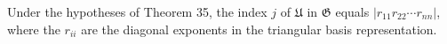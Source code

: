 Under the hypotheses of Theorem 35, the index $j$ of $\mathfrak{U}$ in $\mathfrak{G}$ equals $|r_{11}r_{22}\cdots r_{nn}|$, where the $r_{ii}$ are the diagonal exponents in the triangular basis representation.
